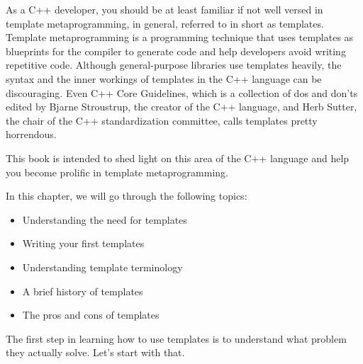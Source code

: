 As a C++ developer, you should be at least familiar if not well versed in template metaprogramming, in general, referred to in short as templates. Template metaprogramming is a programming technique that uses templates as blueprints for the compiler to generate code and help developers avoid writing repetitive code. Although general-purpose libraries use templates heavily, the syntax and the inner workings of templates in the C++ language can be discouraging. Even C++ Core Guidelines, which is a collection of dos and don'ts edited by Bjarne Stroustrup, the creator of the C++ language, and Herb Sutter, the chair of the C++ standardization committee, calls templates pretty horrendous.

This book is intended to shed light on this area of the C++ language and help you become prolific in template metaprogramming.

In this chapter, we will go through the following topics:

\begin{itemize}
\item
Understanding the need for templates

\item
Writing your first templates

\item
Understanding template terminology

\item
A brief history of templates

\item
The pros and cons of templates
\end{itemize}

The first step in learning how to use templates is to understand what problem they actually solve. Let's start with that.








